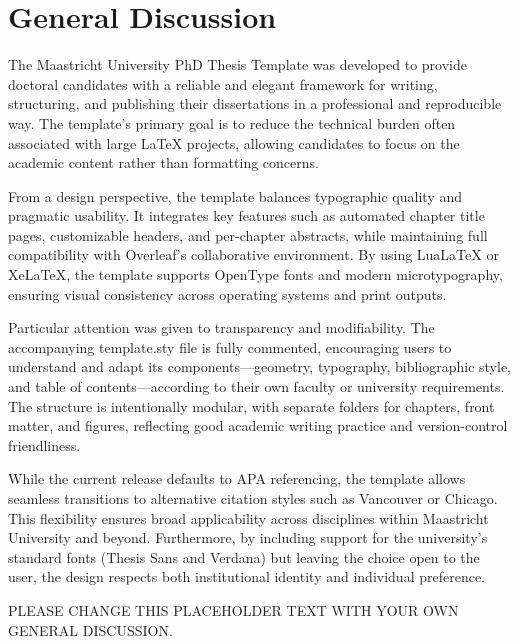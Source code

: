 \section{General Discussion}

The Maastricht University PhD Thesis Template was developed to provide doctoral candidates with a reliable and elegant framework for writing, structuring, and publishing their dissertations in a professional and reproducible way. The template’s primary goal is to reduce the technical burden often associated with large LaTeX projects, allowing candidates to focus on the academic content rather than formatting concerns.

\vspace{1em}
From a design perspective, the template balances typographic quality and pragmatic usability. It integrates key features such as automated chapter title pages, customizable headers, and per-chapter abstracts, while maintaining full compatibility with Overleaf’s collaborative environment. By using LuaLaTeX or XeLaTeX, the template supports OpenType fonts and modern microtypography, ensuring visual consistency across operating systems and print outputs.

\vspace{1em}
Particular attention was given to transparency and modifiability. The accompanying template.sty file is fully commented, encouraging users to understand and adapt its components—geometry, typography, bibliographic style, and table of contents—according to their own faculty or university requirements. The structure is intentionally modular, with separate folders for chapters, front matter, and figures, reflecting good academic writing practice and version-control friendliness.

\vspace{1em}
While the current release defaults to APA referencing, the template allows seamless transitions to alternative citation styles such as Vancouver or Chicago. This flexibility ensures broad applicability across disciplines within Maastricht University and beyond. Furthermore, by including support for the university’s standard fonts (Thesis Sans and Verdana) but leaving the choice open to the user, the design respects both institutional identity and individual preference.

\vspace{1em}
PLEASE CHANGE THIS PLACEHOLDER TEXT WITH YOUR OWN GENERAL DISCUSSION.